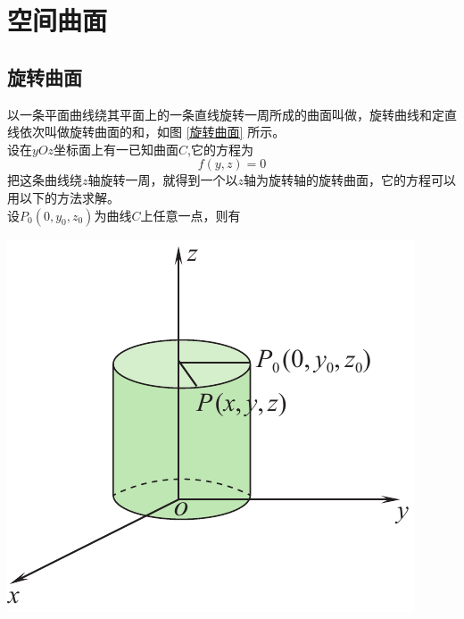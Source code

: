 \newpage
\section{空间曲面}
\subsection{旋转曲面}

\vspace*{-0.5em}
\vspace*{0.2em}

\noindent
\begin{minipage}{0.65\linewidth}
\hspace*{2em}以一条平面曲线绕其平面上的一条直线旋转一周所成的曲面叫做，旋转曲线和定直线依次叫做旋转曲面的和，如图 \ref{旋转曲面} 所示。\\
\hspace*{2em}设在$yOz$坐标面上有一已知曲面$C$,它的方程为
\begin{equation}
	f(y,z)=0
\end{equation}
把这条曲线绕$z$轴旋转一周，就得到一个以$z$轴为旋转轴的旋转曲面，它的方程可以用以下的方法求解。\\
\hspace*{2em}设$P_0(0,y_0,z_0)$为曲线$C$上任意一点，则有
\end{minipage}
\begin{minipage}{0.35\linewidth}
	\centering
	\includegraphics[width = 0.9\linewidth]{pic/C-5/yz}
	\vspace*{-2em}
	\label{旋转曲面}
\end{minipage}

